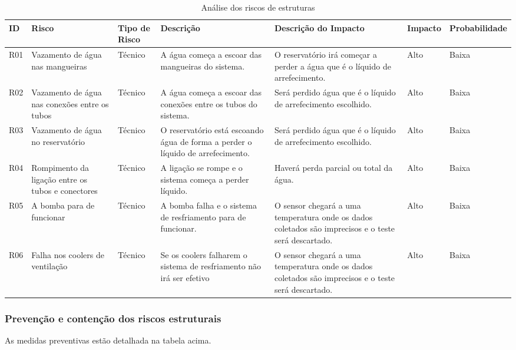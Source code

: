 \begin{table}
    \centering
    \begin{tabular}{|p{1cm}|p{2.2cm}|p{1.8cm}|p{3cm}|p{3cm}|p{1.7cm}|p{2cm}|}
    \hline
    \textbf{ID}  & \textbf{Risco} & \textbf{Tipo de Risco} & \textbf{Descrição} & \textbf{Descrição do Impacto} & \textbf{Impacto} & \textbf{Probabilidade} \\ \hline
    R01 & Vazamento de água nas mangueiras & Técnico & A água começa a escoar das mangueiras do sistema. & O reservatório irá começar a perder a água que é o líquido de arrefecimento. & Alto & Baixa \\ \hline
    R02 & Vazamento de água nas conexões entre os tubos & Técnico & A água começa a escoar das conexões entre os tubos do sistema. & Será perdido água que é o líquido de arrefecimento escolhido. & Alto & Baixa \\ \hline
    R03 & Vazamento de água no reservatório & Técnico & O reservatório está escoando água de forma a perder o líquido de arrefecimento. & Será perdido água que é o líquido de arrefecimento escolhido. & Alto & Baixa \\ \hline
    R04 & Rompimento da ligação entre os tubos e conectores & Técnico & A ligação se rompe e o sistema começa a perder líquido. &Haverá perda parcial ou total da água.  & Alto & Baixa \\ \hline
    R05 & A bomba para de funcionar & Técnico & A bomba falha e o sistema de resfriamento para de funcionar. &O sensor chegará a uma temperatura onde os dados coletados são imprecisos e o teste será descartado.  & Alto & Baixa \\ \hline
    R06 & Falha nos coolers de ventilação & Técnico & Se os coolers falharem o sistema de resfriamento não irá ser efetivo  & O sensor chegará a uma temperatura onde os dados coletados são imprecisos e o teste será descartado.  & Alto & Baixa \\ \hline    
\end{tabular}
    \caption{Análise dos riscos de estruturas}
    \end{table} 


\subsubsection{Prevenção e contenção dos riscos estruturais}

As medidas preventivas estão detalhada na tabela acima.

